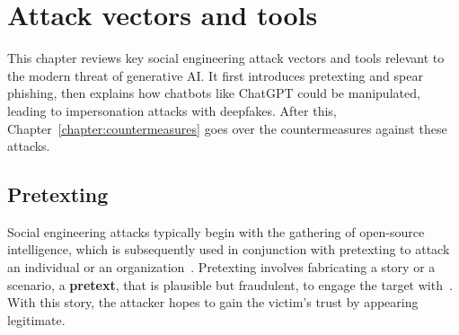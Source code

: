 


\chapter{Attack vectors and tools \label{chapter:attacks}}
\begin{comment}

Guides:
    - About 3-4 pages

What to cover:
    - Attacks
        - Deepfake generated synthetic media

\end{comment}

This chapter reviews key social engineering attack vectors and tools relevant to the modern threat of generative AI. It first introduces pretexting and spear phishing, then explains how chatbots like ChatGPT could be manipulated, leading to impersonation attacks with deepfakes. After this, Chapter~\ref{chapter:countermeasures} goes over the countermeasures against these attacks.





\section{Pretexting}
\begin{comment}

    - How AI powers up pretexting?
        - How AI tech can be utilized to create more sophisticated and convincing pretexts
        - Examples of successful pretexting attacks and their impacts
        - Analysis of pretexting evolving landscape with AI
    - Ethical considerations?
        
\end{comment}

Social engineering attacks typically begin with the gathering of open-source intelligence, which is subsequently used in conjunction with pretexting to attack an individual or an organization~\citep{hadnagy_Social_Engineering_The_Science_2018}. Pretexting involves fabricating a story or a scenario, a \textbf{pretext}, that is plausible but fraudulent, to engage the target with~\citep{wang_Defining_Social_Engineering_2020}. With this story, the attacker hopes to gain the victim's trust by appearing legitimate. 

